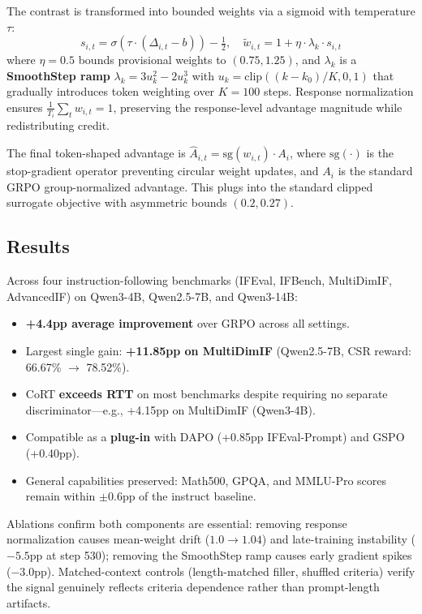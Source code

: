 \documentclass[11pt,a4paper]{article}
\begin{document}
The contrast is transformed into bounded weights via a sigmoid with temperature $\tau$:
\begin{equation}
    s_{i,t} = \sigma(\tau \cdot (\Delta_{i,t} - b)) - \tfrac{1}{2}, \quad
    \tilde{w}_{i,t} = 1 + \eta \cdot \lambda_k \cdot s_{i,t}
\end{equation}
where $\eta = 0.5$ bounds provisional weights to $(0.75, 1.25)$, and $\lambda_k$ is a \textbf{SmoothStep ramp} $\lambda_k = 3u_k^2 - 2u_k^3$ with $u_k = \text{clip}((k - k_0)/K, 0, 1)$ that gradually introduces token weighting over $K = 100$ steps. Response normalization ensures $\frac{1}{T_i}\sum_t w_{i,t} = 1$, preserving the response-level advantage magnitude while redistributing credit.

The final token-shaped advantage is $\hat{A}_{i,t} = \text{sg}(w_{i,t}) \cdot A_i$, where $\text{sg}(\cdot)$ is the stop-gradient operator preventing circular weight updates, and $A_i$ is the standard GRPO group-normalized advantage. This plugs into the standard clipped surrogate objective with asymmetric bounds $(0.2, 0.27)$.

\subsection{Results}
Across four instruction-following benchmarks (IFEval, IFBench, MultiDimIF, AdvancedIF) on Qwen3-4B, Qwen2.5-7B, and Qwen3-14B:
\begin{itemize}
    \item \textbf{+4.4pp average improvement} over GRPO across all settings.
    \item Largest single gain: \textbf{+11.85pp on MultiDimIF} (Qwen2.5-7B, CSR reward: 66.67\% $\to$ 78.52\%).
    \item CoRT \textbf{exceeds RTT} on most benchmarks despite requiring no separate discriminator---e.g., +4.15pp on MultiDimIF (Qwen3-4B).
    \item Compatible as a \textbf{plug-in} with DAPO (+0.85pp IFEval-Prompt) and GSPO (+0.40pp).
    \item General capabilities preserved: Math500, GPQA, and MMLU-Pro scores remain within $\pm$0.6pp of the instruct baseline.
\end{itemize}

Ablations confirm both components are essential: removing response normalization causes mean-weight drift ($1.0 \to 1.04$) and late-training instability ($-5.5$pp at step 530); removing the SmoothStep ramp causes early gradient spikes ($-3.0$pp). Matched-context controls (length-matched filler, shuffled criteria) verify the signal genuinely reflects criteria dependence rather than prompt-length artifacts.
\end{document}
